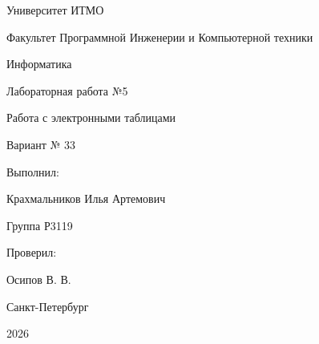 \begin{titlepage}
    \thispagestyle{empty}
    \begin{center}
        Университет ИТМО
    \end{center}
    
    \vspace{1.5cm}
    
    \begin{center}
        Факультет Программной Инженерии и Компьютерной техники
    \end{center}
    
    \vspace{3cm}
    
    \begin{center}
        Информатика
        
        \vspace{0.3cm}
        
        Лабораторная работа №5
        
        \vspace{0.3cm}
        
        Работа с электронными таблицами
        
        \vspace{0.3cm}
        
        Вариант № 33
        
    \end{center}

    \vspace{2.5cm}

    \begin{flushright}
        Выполнил:
        
        \vspace{0.3cm}
        
        Крахмальников Илья Артемович
        
        \vspace{0.3cm}
        
        Группа Р3119
        
        \vspace{1.5cm}
        
        Проверил:
        
        \vspace{0.3cm}
        
        Осипов В. В.
    \end{flushright}

    \vfill

    \begin{center}
        Санкт-Петербург
        
        \vspace{0.3cm}
        
        2026
    \end{center}

\end{titlepage}
